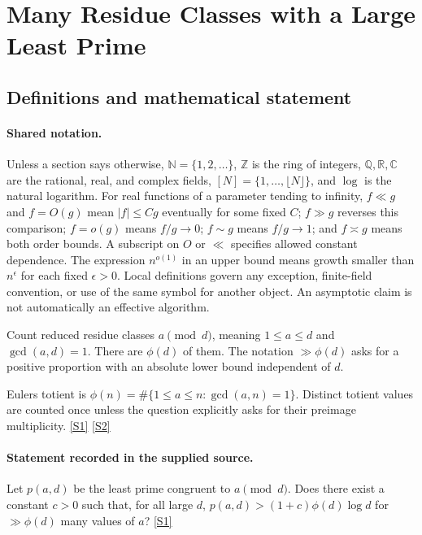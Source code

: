 \documentclass[11pt,a4paper]{article}
\newcommand{\N}{\mathbb{N}}
\newcommand{\Z}{\mathbb{Z}}
\newcommand{\Q}{\mathbb{Q}}
\newcommand{\R}{\mathbb{R}}
\newcommand{\C}{\mathbb{C}}
\newcommand{\sref}[2]{\hyperlink{source:#1:#2}{[S#2]}}
\begin{document}
\section{Many Residue Classes with a Large Least Prime}\label{statement}


\subsection{Definitions and mathematical statement}

\paragraph{Shared notation.}Unless a section says otherwise, $\N=\{1,2,\ldots\}$,
$\Z$ is the ring of integers, $\Q,\R,\C$ are the rational, real, and complex
fields, $[N]=\{1,\ldots,\lfloor N\rfloor\}$, and $\log$ is the natural
logarithm. For real functions of a parameter tending to infinity,
$f\ll g$ and $f=O(g)$ mean $|f|\leq Cg$ eventually for some fixed $C$;
$f\gg g$ reverses this comparison; $f=o(g)$ means $f/g\to0$;
$f\sim g$ means $f/g\to1$; and $f\asymp g$ means both order bounds.
A subscript on $O$ or $\ll$ specifies allowed constant dependence.
The expression $n^{o(1)}$ in an upper bound means growth smaller than
$n^\epsilon$ for each fixed $\epsilon>0$. Local definitions govern any
exception, finite-field convention, or use of the same symbol for another
object. An asymptotic claim is not automatically an effective algorithm.



Count reduced residue classes $a\pmod d$, meaning $1\leq a\leq d$ and $\gcd(a,d)=1$. There are $\phi(d)$ of them. The notation $\gg\phi(d)$ asks for a positive proportion with an absolute lower bound independent of $d$.

Euler\textquotesingle s totient is $\phi(n)=\#\{1\leq a\leq n:\gcd(a,n)=1\}$. Distinct totient values are counted once unless the question explicitly asks for their preimage multiplicity. \sref{statement}{1} \sref{statement}{2}

\paragraph{Statement recorded in the supplied source.}
Let $p(a,d)$ be the least prime congruent to $a\pmod{d}$. Does there exist a constant $c>0$ such that, for all large $d$, $ p(a,d) > (1+c)\phi(d)\log d $ for $\gg \phi(d)$ many values of $a$? \sref{statement}{1}
\end{document}
